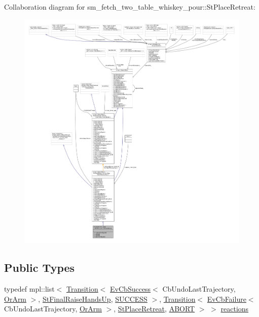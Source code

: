 Collaboration diagram for sm\+\_\+fetch\+\_\+two\+\_\+table\+\_\+whiskey\+\_\+pour\+:\+:St\+Place\+Retreat\+:
\nopagebreak
\begin{figure}[H]
\begin{center}
\leavevmode
\includegraphics[width=350pt]{structsm__fetch__two__table__whiskey__pour_1_1StPlaceRetreat__coll__graph}
\end{center}
\end{figure}
\subsection*{Public Types}
\begin{DoxyCompactItemize}
\item 
typedef mpl\+::list$<$ \hyperlink{classsmacc_1_1Transition}{Transition}$<$ \hyperlink{structsmacc_1_1EvCbSuccess}{Ev\+Cb\+Success}$<$ Cb\+Undo\+Last\+Trajectory, \hyperlink{classsm__fetch__two__table__whiskey__pour_1_1OrArm}{Or\+Arm} $>$, \hyperlink{structsm__fetch__two__table__whiskey__pour_1_1StFinalRaiseHandsUp}{St\+Final\+Raise\+Hands\+Up}, \hyperlink{structsmacc_1_1default__transition__tags_1_1SUCCESS}{S\+U\+C\+C\+E\+SS} $>$, \hyperlink{classsmacc_1_1Transition}{Transition}$<$ \hyperlink{structsmacc_1_1EvCbFailure}{Ev\+Cb\+Failure}$<$ Cb\+Undo\+Last\+Trajectory, \hyperlink{classsm__fetch__two__table__whiskey__pour_1_1OrArm}{Or\+Arm} $>$, \hyperlink{structsm__fetch__two__table__whiskey__pour_1_1StPlaceRetreat}{St\+Place\+Retreat}, \hyperlink{structsmacc_1_1default__transition__tags_1_1ABORT}{A\+B\+O\+RT} $>$ $>$ \hyperlink{structsm__fetch__two__table__whiskey__pour_1_1StPlaceRetreat_ac25d5417461c2afbf484e23c05eaa058}{reactions}
\end{DoxyCompactItemize}
